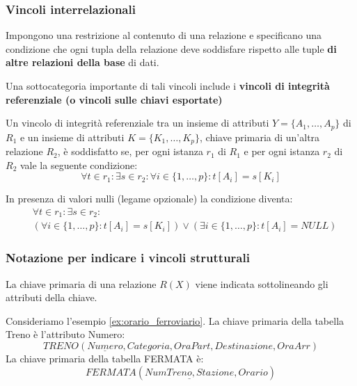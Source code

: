 \documentclass[a4paper,twoside]{article}
\begin{document}
\subsubsection{Vincoli interrelazionali}
Impongono una restrizione al contenuto di una relazione e
specificano una condizione che ogni tupla della relazione
deve soddisfare rispetto alle tuple \textbf{di altre relazioni della base}
di dati.

Una sottocategoria importante di tali vincoli include i \textbf{vincoli
di integrità referenziale (o vincoli sulle chiavi esportate)}

\begin{definition}
  Un vincolo di integrità referenziale tra un insieme di attributi
  \( Y = \{A_1, \ldots, A_p\}  \) di \( R_1 \) e un insieme di attributi
  \( K = \{K_1, \ldots, K_p\} \), chiave primaria di un'altra relazione \( R_2 \),
  è soddisfatto se, per ogni istanza \( r_1 \) di \( R_1 \) e per ogni istanza
  \( r_2 \) di \( R_2 \) vale la seguente condizione:
  \[
    \forall t \in r_1: \exists s \in r_2: \forall i \in \{1, \ldots, p\}: t[A_i] = s[K_i]
  \] 

  \vspace{1em}
  \noindent
  In presenza di valori nulli (legame opzionale) la condizione diventa:
  \[
    \begin{aligned}
      &\forall t \in r_1: \exists s \in r_2:\\
      &\left( \forall i \in \{1, \ldots, p\}:
      t[A_i] = s[K_i] \right) \vee \left( \exists i \in \{1, \ldots, p\}: t[A_i] = NULL \right)
    \end{aligned}
  \] 
\end{definition}

\subsubsection{Notazione per indicare i vincoli strutturali}
La chiave primaria di una relazione \( R(X) \) viene indicata sottolineando gli attributi
della chiave.
\begin{example}
  Consideriamo l'esempio \ref{ex:orario_ferroviario}. La chiave primaria
  della tabella Treno è l'attributo Numero:
  \[
    TRENO(\underline{Numero}, Categoria, OraPart, Destinazione, OraArr)
  \] 
  La chiave primaria della tabella FERMATA è:
  \[
    FERMATA(\underline{NumTreno, Stazione}, Orario)
  \]
\end{example}
\end{document}
